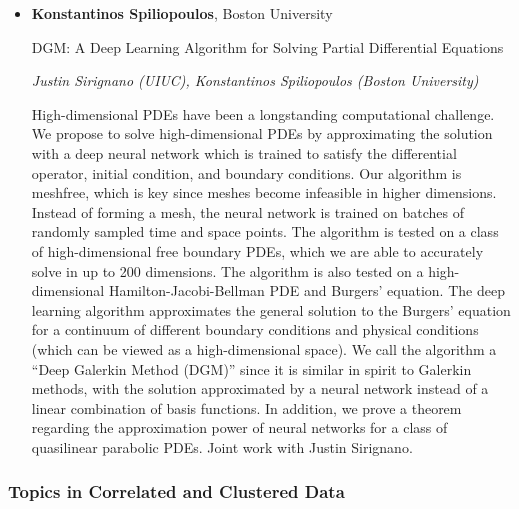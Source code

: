 \begin{itemize}
\item \textbf{Konstantinos Spiliopoulos}, Boston University

DGM: A Deep Learning Algorithm for Solving Partial Differential Equations

\emph{\footnotesize Justin Sirignano (UIUC), Konstantinos Spiliopoulos (Boston University)}

High-dimensional PDEs have been a longstanding computational challenge. We propose to solve high-dimensional PDEs by approximating the solution with a deep neural network which is trained to satisfy the differential operator, initial condition, and boundary conditions. Our algorithm is meshfree, which is key since meshes become infeasible in higher dimensions. Instead of forming a mesh, the neural network is trained on batches of randomly sampled time and space points. The algorithm is tested on a class of high-dimensional free boundary PDEs, which we are able to accurately solve in up to 200 dimensions. The algorithm is also tested on a high-dimensional Hamilton-Jacobi-Bellman PDE and Burgers' equation. The deep learning algorithm approximates the general solution to the Burgers' equation for a continuum of different boundary conditions and physical conditions (which can be viewed as a high-dimensional space). We call the algorithm a ``Deep Galerkin Method (DGM)'' since it is similar in spirit to Galerkin methods, with the solution approximated by a neural network instead of a linear combination of basis functions. In addition, we prove a theorem regarding the approximation power of neural networks for a class of quasilinear parabolic PDEs. Joint work with Justin Sirignano.

\end{itemize}

\subsubsection*{Topics in Correlated and Clustered Data}

